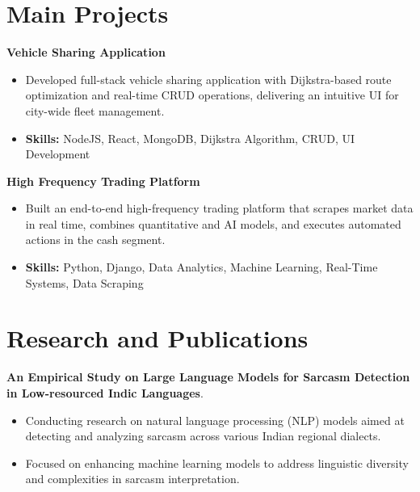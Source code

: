 \documentclass[a4paper,11pt]{article}
\begin{document}
\section{\textbf{Main Projects}}

\vspace{1mm}
  \textbf{Vehicle Sharing Application  }
\vspace{-1.5mm} %
\begin{itemize}
  \item Developed full-stack vehicle sharing application with Dijkstra-based route optimization and real-time CRUD operations, delivering an intuitive UI for city-wide fleet management.
\vspace{-3mm}
  \item \textbf{Skills:} NodeJS, React, MongoDB, Dijkstra Algorithm, CRUD, UI Development
\end{itemize}


\vspace{1mm}
   \textbf{High Frequency Trading Platform }
\vspace{-1.5mm} %
\begin{itemize}
  \item Built an end-to-end high-frequency trading platform that scrapes market data in real time, combines quantitative and AI models, and executes automated actions in the cash segment.
\vspace{-3mm}
  \item \textbf{Skills:} Python, Django, Data Analytics, Machine Learning, Real-Time Systems, Data Scraping
\end{itemize}



\section{\textbf{Research and Publications} \hfill }
\vspace{1mm}
  \textbf{An Empirical Study on Large Language Models for Sarcasm Detection in Low-resourced Indic Languages}.
\vspace{-1mm} %
\begin{itemize}
  \item Conducting research on natural language processing (NLP) models aimed at detecting and analyzing sarcasm across various Indian regional dialects.
\vspace{-3mm}
  \item Focused on enhancing machine learning models to address linguistic diversity and complexities in sarcasm interpretation.
\end{itemize}
\end{document}
